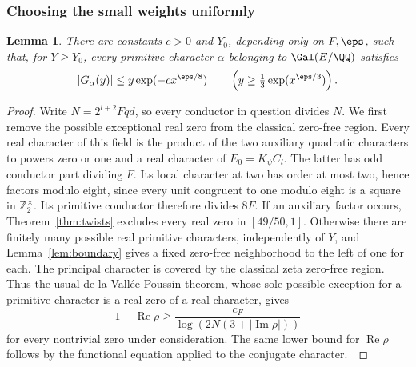 \documentclass[a4paper,11pt]{article}
\newtheorem{lemma}[proposition]{Lemma}
\theoremstyle{definition}
\theoremstyle{remark}
\newcommand{\ZZ}{\mathbb Z}\newcommand{\ord}{\operatorname{ord}}
\newcommand{\real}{\operatorname{Re}}\newcommand{\imag}{\operatorname{Im}}
\numberwithin{equation}{section}
\begin{document}
\subsubsection{Choosing the small weights uniformly}\label{nav:II-05}
\begin{lemma}\label{lem:far14}
There are constants \(c>0\) and \(Y_0\), depending only on \(F,\eps\), such that, for \(Y\ge Y_0\), every primitive character \(\alpha\) belonging to \(\Gal(E/\QQ)\) satisfies
\[
 |G_\alpha(y)|\le y\exp(-c x^{\eps/8})
 \qquad\left(y\ge \tfrac13\exp(x^{\eps/3})\right).
\]
\end{lemma}
\begin{proof}
Write \(N=2^{l+2}Fqd\), so every conductor in question divides \(N\). We first remove the possible exceptional real zero from the classical zero-free region. Every real character of this field is the product of the two auxiliary quadratic characters to powers zero or one and a real character of \(E_0=K_\psi C_l\). The latter has odd conductor part dividing \(F\). Its local character at two has order at most two, hence factors modulo eight, since every unit congruent to one modulo eight is a square in \(\ZZ_2^\times\). Its primitive conductor therefore divides \(8F\). If an auxiliary factor occurs, Theorem~\ref{thm:twists} excludes every real zero in \([49/50,1]\). Otherwise there are finitely many possible real primitive characters, independently of \(Y\), and Lemma~\ref{lem:boundary} gives a fixed zero-free neighborhood to the left of one for each. The principal character is covered by the classical zeta zero-free region. Thus the usual de la Vall\'ee Poussin theorem, whose sole possible exception for a primitive character is a real zero of a real character, gives
\[
    1-\real\rho\ge
        \frac{c_F}{\log(2N(3+|\imag\rho|))}
\]
for every nontrivial zero under consideration. The same lower bound for \(\real\rho\) follows by the functional equation applied to the conjugate character.~\cite{I-I-I-elkies,I-I-I-tz}


\end{proof}
\end{document}
